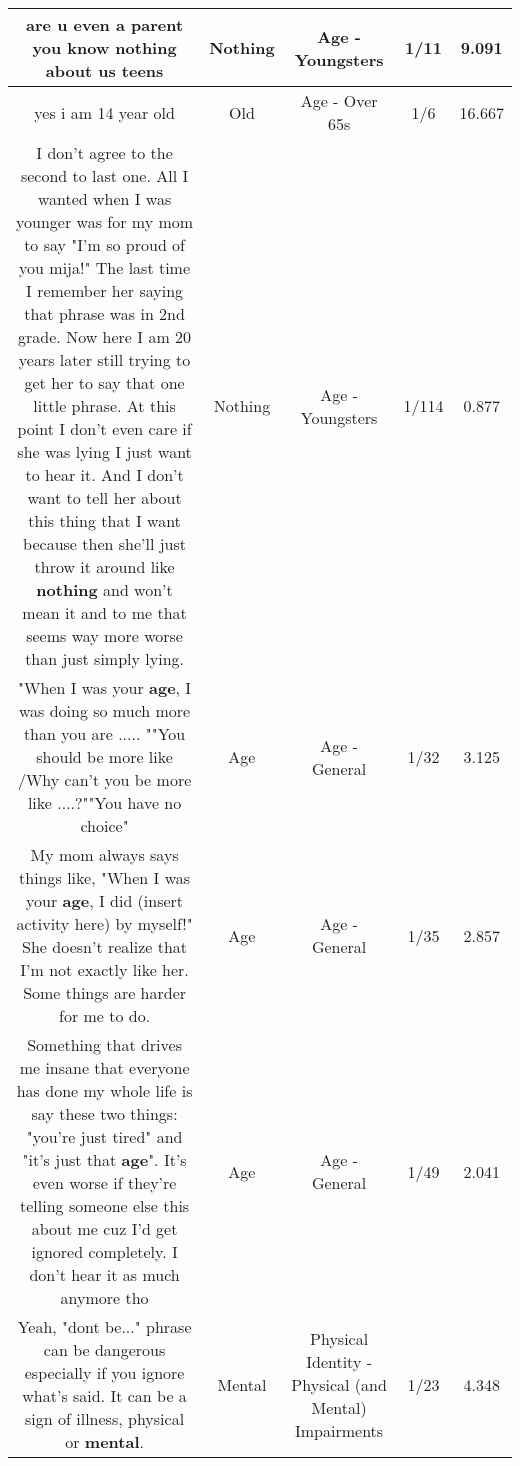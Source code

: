 \documentclass[11pt]{article}
\newlength\mylength
\begin{document}
\begin{center}
\begin{longtable}{|C{.65\mylength}|C{.30\mylength}|C{.12\mylength}|C{.12\mylength}|C{.12\mylength}|}
  \small are u even a parent you know \textbf{nothing} about us teens\normalsize   & Nothing & Age - Youngsters & 1/11 & 9.091 \\  \hline
  \small yes i am 14 year old\normalsize   & Old & Age - Over 65s & 1/6 & 16.667 \\  \hline
  \small I don't agree to the second to last one. All I wanted when I was younger was for my mom to say "I'm so proud of you mija!" The last time I remember her saying that phrase was in 2nd grade. Now here I am 20 years later still trying to get her to say that one little phrase. At this point I don't even care if she was lying I just want to hear it. And I don't want to tell her about this thing that I want because then she'll just throw it around like \textbf{nothing} and won't mean it and to me that seems way more worse than just simply lying.\normalsize   & Nothing & Age - Youngsters & 1/114 & 0.877 \\  \hline
  \small "When I was your \textbf{age}, I was doing so much more than you are ..... ""You should be more like /Why can't you be more like ....?""You have no choice"\normalsize   & Age & Age - General & 1/32 & 3.125 \\  \hline
  \small My mom always says things like, "When I was your \textbf{age}, I did (insert activity here) by myself!"  She doesn't realize that I'm not exactly like her. Some things are harder for me to do.\normalsize   & Age & Age - General & 1/35 & 2.857 \\  \hline
  \small Something that drives me insane that everyone has done my whole life is say these two things: "you're just tired" and "it's just that \textbf{age}". It's even worse if they're telling someone else this about me cuz I'd get ignored completely. I don't hear it as much anymore tho\normalsize   & Age & Age - General & 1/49 & 2.041 \\  \hline
  \small Yeah, "dont be..." phrase can be dangerous especially if you ignore what's said. It can be a sign of illness, physical or \textbf{mental}.\normalsize   & Mental & Physical Identity - Physical (and Mental) Impairments & 1/23 & 4.348 \\  \hline

\end{longtable}
\end{center}
\end{document}
